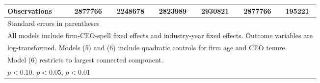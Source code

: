 \begin{table}[htbp]
\begin{tabular}{l*{6}{c}}
\midrule
Observations        &     2877766         &     2248678         &     2823989         &     2930821         &     2877766         &      195221         \\
\bottomrule
\multicolumn{7}{l}{\footnotesize Standard errors in parentheses}\\
\multicolumn{7}{l}{\footnotesize All models include firm-CEO-spell fixed effects and industry-year fixed effects. Outcome variables are}\\
\multicolumn{7}{l}{\footnotesize log-transformed. Models (5) and (6) include quadratic controls for firm age and CEO tenure.}\\
\multicolumn{7}{l}{\footnotesize Model (6) restricts to largest connected component.}\\
\multicolumn{7}{l}{\footnotesize \sym{*} \(p<0.10\), \sym{**} \(p<0.05\), \sym{***} \(p<0.01\)}\\
\end{tabular}
\end{table}
